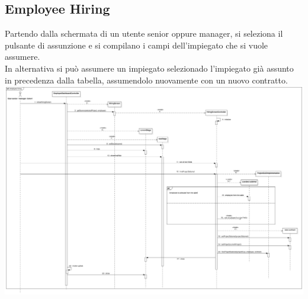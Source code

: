 \documentclass{article}
\begin{document}
\subsection{Employee Hiring}
Partendo dalla schermata di un utente senior oppure manager, si seleziona il pulsante di assunzione e si compilano i campi dell'impiegato che si vuole assumere. \\
In alternativa si può assumere un impiegato selezionado l'impiegato già assunto in precedenza dalla tabella, assumendolo nuovamente con un nuovo contratto.
\medskip \\
\includegraphics[width=\textwidth]{images/sequence_diagram_2.png}
\end{document}
